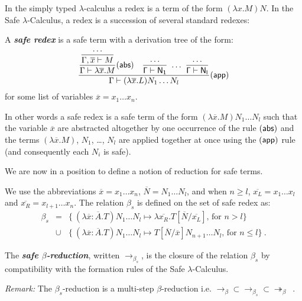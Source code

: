 \documentclass{llncs}
\newcommand\defname[1]{{\bf\em #1}\index{#1}}
\newcommand\betared{\rightarrow_\beta}
\newcommand\betasred{\rightarrow_{\beta_s}}
\newcommand\betaredtr{\twoheadrightarrow_\beta} %
\newcommand\subst[2]{\left[ #1/#2 \right]}
\newcommand\dps{\displaystyle}
\newcommand\rulef[2]{\frac{\dps #1}{\dps #2}}
\begin{document}
In the simply typed $\lambda$-calculus a redex is a term of the form
$(\lambda x . M) N$. In the Safe $\lambda$-Calculus, a redex is a succession of several standard redexes:
\begin{definition}
A \defname{safe redex} is a safe term with a derivation tree of the form:
$$   \rulef{
            \rulef{\rulef{\ldots}{\Gamma, \overline{x}\vdash M}}{\Gamma \vdash \lambda \overline{x} . M} (\sf{abs})
            \quad
            \rulef{\ldots}{\Gamma \vdash N_1}  \ \ldots \  \rulef{\ldots}{\Gamma \vdash N_l}
    }
    {
       \Gamma \vdash (\lambda \overline{x} . L) N_1 \ldots N_l
    } (\sf{app})
$$
for some list of variables $\overline{x}=x_1\ldots x_n$.
\end{definition}

In other words a safe redex is a safe term of the form $(\lambda \overline{x} . M) N_1 \ldots N_l$ such that
the variable $\overline{x}$ are abstracted altogether by one occurrence of the rule $(\sf{abs})$ and the terms $(\lambda \overline{x} . M)$, $N_1$, \ldots, $N_l$ are applied together at once using the $(\sf{app})$ rule
(and consequently each $N_i$ is safe).



We are now in a position to define a notion of reduction for safe terms.

\begin{definition}
\label{dfn:safereduction} We use the
abbreviations $\overline{x} = x_1 \ldots x_n$,
$\overline{N} = N_1 \ldots N_l$, and when $n\geq l$, $\overline{x_L}
= x_1 \ldots x_l$ and $\overline{x_R} = x_{l+1} \ldots x_n$.
The relation $\beta_s$ is defined on the set of safe redex as:
\begin{eqnarray*}
\beta_s &=&
\{  \ (\lambda \overline{x} : \overline{A} . T) N_1 \ldots N_l \mapsto \lambda \overline{x_R}. T\subst{\overline{N}}{\overline{x_L}} \mbox{, for $n> l$}
\} \\
&\cup&
\{ \ (\lambda \overline{x} : \overline{A} . T) N_1 \ldots N_l \mapsto T\subst{\overline{N}}{\overline{x}} N_{n+1} \ldots N_l
\mbox{, for $n\leq l$} \} \ .
\end{eqnarray*}

The \defname{safe $\beta$-reduction}, written $\betasred$, is the closure of
the relation $\beta_s$ by compatibility with the formation rules of
the Safe $\lambda$-Calculus.
\end{definition}

\noindent \emph{Remark:} The $\beta_s$-reduction is a multi-step $\beta$-reduction i.e. $\betared \subset \betasred \subset \betaredtr$\ .
\end{document}
